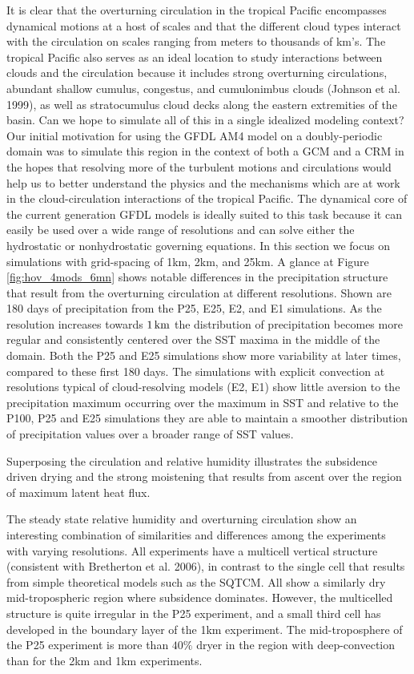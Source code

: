 \documentclass[11pt]{article}   	%
\begin{document}
It is clear that the overturning circulation in the tropical Pacific encompasses dynamical motions at a host of scales and that the 
different cloud types interact with the circulation on scales ranging from meters to thousands of km's.  
The tropical Pacific also serves as an ideal location to study interactions between clouds and the 
circulation because it includes strong overturning circulations, abundant shallow cumulus, congestus, and cumulonimbus 
clouds (Johnson et al. 1999), as well as stratocumulus cloud decks along the eastern extremities of the basin.
Can we hope to simulate all of this in a single idealized modeling context?    
Our initial motivation for using the GFDL AM4 model on a doubly-periodic domain was to simulate this region 
in the context of both a GCM and a CRM in the hopes that resolving more of the turbulent motions and circulations
would help us to better understand the physics and the mechanisms which are at work in the cloud-circulation
interactions of the tropical Pacific.    
The dynamical core of the current generation GFDL models is ideally suited to this task because it can easily 
be used over a wide range of resolutions and can solve either the hydrostatic or nonhydrostatic 
governing equations.  In this section we focus on simulations with grid-spacing of 1km, 2km, and 25km.   
A glance at Figure \ref{fig:hov_4mods_6mn} shows notable differences in the precipitation structure that result from the 
overturning circulation at different resolutions.  Shown are 180 days of precipitation from the P25, E25, E2, and 
E1 simulations.  As the 
resolution increases towards $1 \, \rm{km}$ the distribution of precipitation becomes more regular and consistently 
centered over the SST maxima in the middle of the domain.  Both the P25 and E25 simulations show more 
variability at later 
times, compared to these first 180 days.  The simulations with explicit convection at resolutions typical of 
cloud-resolving 
models (E2, E1) show little aversion to the precipitation maximum occurring over the maximum in SST and relative to 
the P100, P25 and E25 simulations 
they are able to maintain a smoother distribution of  precipitation values over a broader range of SST values.    

Superposing the circulation and relative humidity illustrates the subsidence driven 
drying and the strong moistening that results from ascent over the region of maximum latent heat flux.  

The steady state relative humidity and overturning circulation show an interesting combination of similarities and differences
among the experiments with varying resolutions.  All experiments have a multicell vertical structure (consistent with 
Bretherton et al. 2006), in contrast to the single cell that results from simple theoretical models such as the SQTCM.   All 
show a similarly dry mid-tropospheric region where subsidence dominates.  However, the multicelled structure is quite irregular
in the P25 experiment, and a small third cell has developed in the boundary layer of the 1km experiment.  The mid-troposphere 
of the P25 experiment is more than $40\%$ dryer in the region with deep-convection than for the 2km and 1km experiments. 
\end{document}
